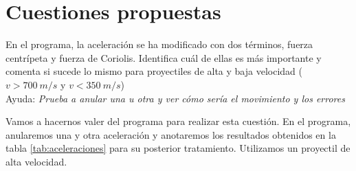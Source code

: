 \documentclass[11pt]{article}
\newcommand{\laputa}[1]{\begin{note}{#1}{}\end{note}}
\begin{document}
    \section{Cuestiones propuestas}
        \vspace{-0.3cm}
        \laputa{En el programa, la aceleración se ha modificado con dos términos, fuerza centrípeta y fuerza de Coriolis. Identifica cuál de ellas es más importante y comenta si sucede lo mismo para proyectiles de alta y baja velocidad ($v>700 \ m/s$ y $v<350\ m/s$)\\
        Ayuda: \textit{Prueba a anular una u otra y ver cómo sería el movimiento y los errores}}   
            \noindent Vamos a hacernos valer del programa para realizar esta cuestión. En el programa, anularemos una y otra aceleración y anotaremos los resultados obtenidos en la tabla \ref{tab:aceleraciones} para su posterior tratamiento. Utilizamos un proyectil de alta velocidad.
            \vspace{-0.1cm}
\end{document}
